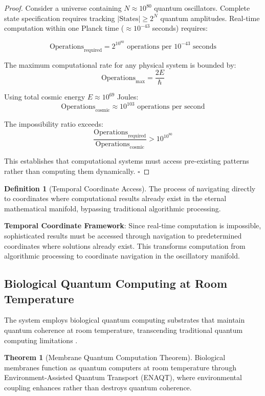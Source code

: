 \documentclass[12pt,a4paper]{article}
\theoremstyle{definition}
\newtheorem{definition}{Definition}[section]
\newtheorem{theorem}{Theorem}[section]
\begin{document}
{\begin{proof}
Consider a universe containing $N \approx 10^{80}$ quantum oscillators. Complete state specification requires tracking $|\text{States}| \geq 2^N$ quantum amplitudes. Real-time computation within one Planck time ($\approx 10^{-43}$ seconds) requires:

$$\text{Operations}_{\text{required}} = 2^{10^{80}} \text{ operations per } 10^{-43} \text{ seconds}$$

The maximum computational rate for any physical system is bounded by:
$$\text{Operations}_{\text{max}} = \frac{2E}{\hbar}$$

Using total cosmic energy $E \approx 10^{69}$ Joules:
$$\text{Operations}_{\text{cosmic}} \approx 10^{103} \text{ operations per second}$$

The impossibility ratio exceeds:
$$\frac{\text{Operations}_{\text{required}}}{\text{Operations}_{\text{cosmic}}} > 10^{10^{80}}$$

This establishes that computational systems must access pre-existing patterns rather than computing them dynamically. $\square$
\end{proof}

\begin{definition}[Temporal Coordinate Access]
The process of navigating directly to coordinates where computational results already exist in the eternal mathematical manifold, bypassing traditional algorithmic processing.
\end{definition}

\textbf{Temporal Coordinate Framework}: Since real-time computation is impossible, sophisticated results must be accessed through navigation to predetermined coordinates where solutions already exist. This transforms computation from algorithmic processing to coordinate navigation in the oscillatory manifold.

\subsection{Biological Quantum Computing at Room Temperature}

The system employs biological quantum computing substrates that maintain quantum coherence at room temperature, transcending traditional quantum computing limitations \cite{sachikonye2024membranes}.

\begin{theorem}[Membrane Quantum Computation Theorem]
Biological membranes function as quantum computers at room temperature through Environment-Assisted Quantum Transport (ENAQT), where environmental coupling enhances rather than destroys quantum coherence.
\end{theorem}

}
\end{document}
